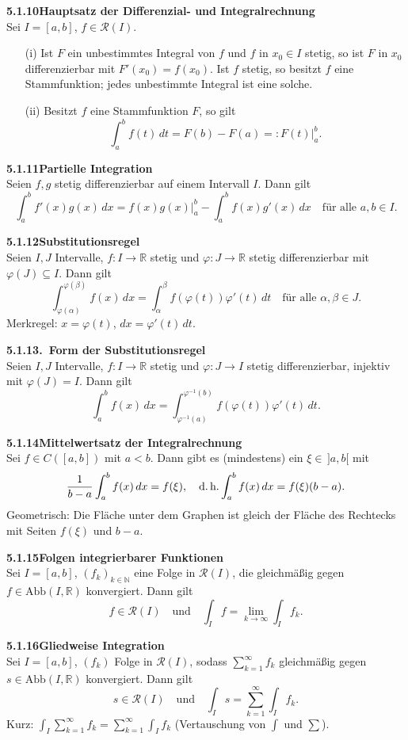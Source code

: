 \documentclass[a4paper,12pt]{article}
\newcommand{\gentry}[3]{%
  \noindent\textbf{#1\quad #2}\nopagebreak\\[0.2em]
  #3\par\smallskip
}
\begin{document}
\gentry{5.1.10}{Hauptsatz der Differenzial- und Integralrechnung}{%
  Sei $I=[a,b]$, $f \in \mathcal{R}(I)$.
  \begin{itemize}[topsep=2pt,itemsep=1pt]
    \item[(i)] Ist $F$ ein unbestimmtes Integral von $f$ und $f$ in $x_0 \in I$ stetig,
      so ist $F$ in $x_0$ differenzierbar mit $F'(x_0) = f(x_0)$. Ist $f$ stetig,
      so besitzt $f$ eine Stammfunktion; jedes unbestimmte Integral ist eine solche.
    \item[(ii)] Besitzt $f$ eine Stammfunktion $F$, so gilt
      \[
        \int_a^b f(t)\,dt = F(b) - F(a) =: F(t)\bigr|_a^b.
      \]
  \end{itemize}
}

\gentry{5.1.11}{Partielle Integration}{%
  Seien $f, g$ stetig differenzierbar auf einem Intervall $I$. Dann gilt
  \[
    \int_a^b f'(x) g(x)\,dx = f(x)g(x)\bigr|_a^b - \int_a^b f(x)g'(x)\,dx
    \quad \text{für alle } a, b \in I.
  \]
}

\gentry{5.1.12}{Substitutionsregel}{%
  Seien $I, J$ Intervalle, $f: I \to \mathbb{R}$ stetig und $\varphi: J \to \mathbb{R}$
  stetig differenzierbar mit $\varphi(J) \subseteq I$. Dann gilt
  \[
    \int_{\varphi(\alpha)}^{\varphi(\beta)} f(x)\,dx = \int_\alpha^\beta f(\varphi(t))\varphi'(t)\,dt
    \quad \text{für alle } \alpha, \beta \in J.
  \]
  Merkregel: $x = \varphi(t)$, $dx = \varphi'(t)\,dt$.
}

\gentry{5.1.13}{2.\ Form der Substitutionsregel}{%
  Seien $I, J$ Intervalle, $f: I \to \mathbb{R}$ stetig und $\varphi: J \to I$
  stetig differenzierbar, injektiv mit $\varphi(J) = I$. Dann gilt
  \[
    \int_a^b f(x)\,dx = \int_{\varphi^{-1}(a)}^{\varphi^{-1}(b)} f(\varphi(t))\varphi'(t)\,dt.
  \]
}

\gentry{5.1.14}{Mittelwertsatz der Integralrechnung}{%
  Sei $f \in C([a,b])$ mit $a<b$. Dann gibt es (mindestens) ein
  $\xi \in\,]a,b[$ mit
  \[
    \frac{1}{b-a} \int_a^b f(x)\,dx = f(\xi),
    \quad \text{d.\,h.} \int_a^b f(x)\,dx = f(\xi)(b-a).
  \]
  Geometrisch: Die Fläche unter dem Graphen ist gleich der Fläche des Rechtecks
  mit Seiten $f(\xi)$ und $b-a$.
}

\gentry{5.1.15}{Folgen integrierbarer Funktionen}{%
  Sei $I=[a,b]$, $(f_k)_{k\in\mathbb{N}}$ eine Folge in $\mathcal{R}(I)$, die
  gleichmäßig gegen $f \in \mathrm{Abb}(I,\mathbb{R})$ konvergiert. Dann gilt
  \[
    f \in \mathcal{R}(I) \quad \text{und} \quad \int_I f = \lim_{k\to\infty} \int_I f_k.
  \]
}

\gentry{5.1.16}{Gliedweise Integration}{%
  Sei $I=[a,b]$, $(f_k)$ Folge in $\mathcal{R}(I)$, sodass $\sum_{k=1}^\infty f_k$
  gleichmäßig gegen $s \in \mathrm{Abb}(I, \mathbb{R})$ konvergiert. Dann gilt
  \[
    s \in \mathcal{R}(I) \quad \text{und} \quad \int_I s = \sum_{k=1}^\infty \int_I f_k.
  \]
  Kurz: $\int_I \sum_{k=1}^\infty f_k = \sum_{k=1}^\infty \int_I f_k$ (Vertauschung von
  $\int$ und $\sum$).
}
\end{document}
